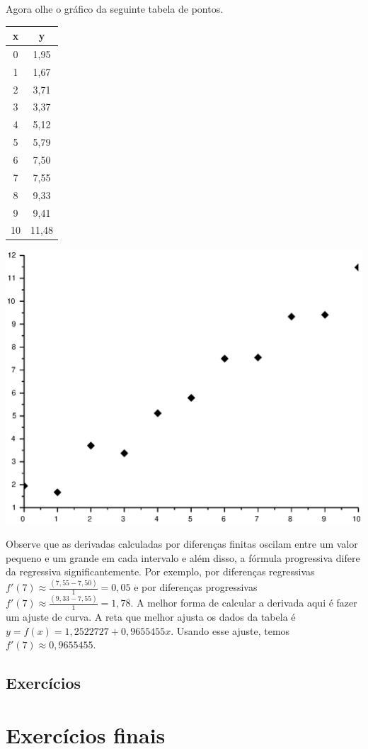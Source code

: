 Agora olhe o gráfico da seguinte tabela de pontos.
\begin{center}
\begin{tabular}{|c|c|}
\hline
x&y\\
\hline
0    & 1,95  \\
\hline
    1&     1,67  \\
		\hline
    2 &    3,71  \\
		\hline
    3  &   3,37  \\
		\hline
    4   &  5,12   \\
		\hline
    5&     5,79  \\
		\hline
    6 &    7,50  \\
		\hline
    7  &   7,55  \\
		\hline
    8   &  9,33  \\
		\hline
    9   &  9,41   \\
		\hline
    10  &  11,48  \\
		\hline
\end{tabular}  
\end{center}
\begin{center}
\includegraphics[scale=0.5]{./cap_derivacao/pics/graf_der.eps}
\end{center}

Observe que as derivadas calculadas por diferenças finitas oscilam entre um valor pequeno e um grande em cada intervalo e além disso, a fórmula progressiva difere da regressiva significantemente. Por exemplo, por diferenças regressivas $f'(7)\approx \frac{(7,55 -  7,50)}{1}=0,05$ e por diferenças progressivas $f'(7)\approx \frac{(9,33 -  7,55)}{1}=1,78$. A melhor forma de calcular a derivada aqui é fazer um ajuste de curva. A reta que melhor ajusta os dados da tabela é $y=f(x)=1,2522727+0,9655455x$. Usando esse ajuste, temos $f'(7)\approx 0,9655455$.

\subsection*{Exercícios}

\emconstrucao


\section{Exercícios finais}

\emconstrucao

% 
